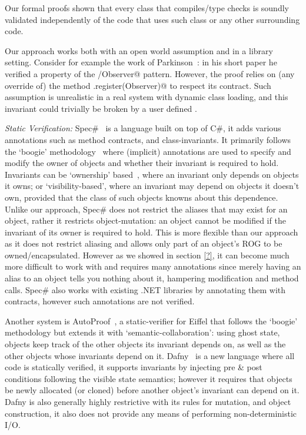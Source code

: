 Our formal proofs shown that every class that compiles/type checks is soundly validated independently of the code that uses such class or any other surrounding code.

Our approach works both with an open world assumption and in a library setting.
Consider for example the work of Parkinson~\cite{parkinson2007class}: in his short paper he verified a property of the \Q@Subject/Observer@ pattern. However, the proof relies on (any override of) the method \Q@Subject.register(Observer)@ to respect its contract. Such assumption is unrealistic in a real system with dynamic class loading, and this invariant could trivially be broken by a user defined \Q@EvilSubject@.

\textit{Static Verification:}
Spec\#~\cite{?} is a language built on top of C\#, it adds various annotations such as method contracts, and class-invariants. 
It primarily follows the `boogie' methodology~\cite{?} where (implicit) annotations are used to specify and modify the owner of objects and whether their invariant is required to hold. Invariants can be `ownership' based~\cite{?}, where an invariant only depends on objects it owns; or `visibility-based', where an invariant may depend on objects it doesn't own, provided that the class of such objects knowns about this dependence. Unlike our approach, Spec\# does not restrict the aliases that may exist for an object, rather it restricts object-mutation: an object cannot be modified if the invariant of its owner is required to hold. This is more flexible than our approach as it does not restrict aliasing and allows only part of an object's ROG to be owned/encapsulated. However as we showed in section \ref{?}, it can become much more difficult to work with and requires many annotations since merely having an alias to an object tells you nothing about it, hampering modification and method calls. Spec\# also works with existing .NET libraries by annotating them with contracts, however such annotations are not verified.	

Another system is AutoProof~\cite{?}, a static-verifier for Eiffel that follows the `boogie' methodology but extends it with `semantic-collaboration': using ghost state, objects keep track of the other objects its invariant depends on, as well as the other objects whose invariants depend on it. Dafny~\cite{?} is a new language where all code is statically verified, it supports invariants by injecting pre \& post conditions following the visible state semantics; however it requires that objects be newly allocated (or cloned) before another object's invariant can depend on it. Dafny is also generally highly restrictive with its rules for mutation, and object construction, it also does not provide any means of performing non-deterministic I/O.



